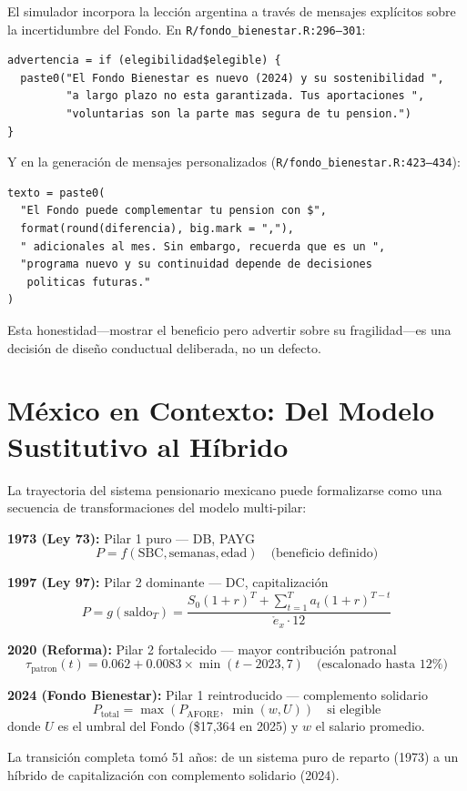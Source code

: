 \documentclass[11pt,a4paper]{report}
\begin{document}
\begin{tcolorbox}[colback=orange!5!white, colframe=orange!75!black, title=\textbf{Aplicaci\'on en C\'odigo: Advertencia sobre Sostenibilidad del Fondo}]
El simulador incorpora la lecci\'on argentina a trav\'es de mensajes expl\'icitos sobre la incertidumbre del Fondo. En \texttt{R/fondo\_bienestar.R:296--301}:

\begin{lstlisting}
advertencia = if (elegibilidad$elegible) {
  paste0("El Fondo Bienestar es nuevo (2024) y su sostenibilidad ",
         "a largo plazo no esta garantizada. Tus aportaciones ",
         "voluntarias son la parte mas segura de tu pension.")
}
\end{lstlisting}

Y en la generaci\'on de mensajes personalizados (\texttt{R/fondo\_bienestar.R:423--434}):
\begin{lstlisting}
texto = paste0(
  "El Fondo puede complementar tu pension con $",
  format(round(diferencia), big.mark = ","),
  " adicionales al mes. Sin embargo, recuerda que es un ",
  "programa nuevo y su continuidad depende de decisiones
   politicas futuras."
)
\end{lstlisting}

Esta honestidad---mostrar el beneficio pero advertir sobre su fragilidad---es una decisi\'on de dise\~no conductual deliberada, no un defecto.
\end{tcolorbox}


\section{M\'exico en Contexto: Del Modelo Sustitutivo al H\'ibrido}

\begin{tcolorbox}[colback=blue!5!white, colframe=blue!75!black, title=\textbf{Definici\'on Formal: Evoluci\'on del Sistema Mexicano}]
La trayectoria del sistema pensionario mexicano puede formalizarse como una secuencia de transformaciones del modelo multi-pilar:

\textbf{1973 (Ley 73):} Pilar 1 puro --- DB, PAYG
\[
  P = f(\text{SBC}, \text{semanas}, \text{edad}) \quad \text{(beneficio definido)}
\]

\textbf{1997 (Ley 97):} Pilar 2 dominante --- DC, capitalizaci\'on
\[
  P = g(\text{saldo}_T) = \frac{S_0(1+r)^T + \sum_{t=1}^{T} a_t(1+r)^{T-t}}{\mathring{e}_x \cdot 12}
\]

\textbf{2020 (Reforma):} Pilar 2 fortalecido --- mayor contribuci\'on patronal
\[
  \tau_{\text{patron}}(t) = 0.062 + 0.0083 \times \min(t - 2023, 7) \quad \text{(escalonado hasta 12\%)}
\]

\textbf{2024 (Fondo Bienestar):} Pilar 1 reintroducido --- complemento solidario
\[
  P_{\text{total}} = \max\left(P_{\text{AFORE}},\; \min(w, U)\right) \quad \text{si elegible}
\]
donde $U$ es el umbral del Fondo (\$17,364 en 2025) y $w$ el salario promedio.

La transici\'on completa tom\'o 51 a\~nos: de un sistema puro de reparto (1973) a un h\'ibrido de capitalizaci\'on con complemento solidario (2024).
\end{tcolorbox}
\end{document}
